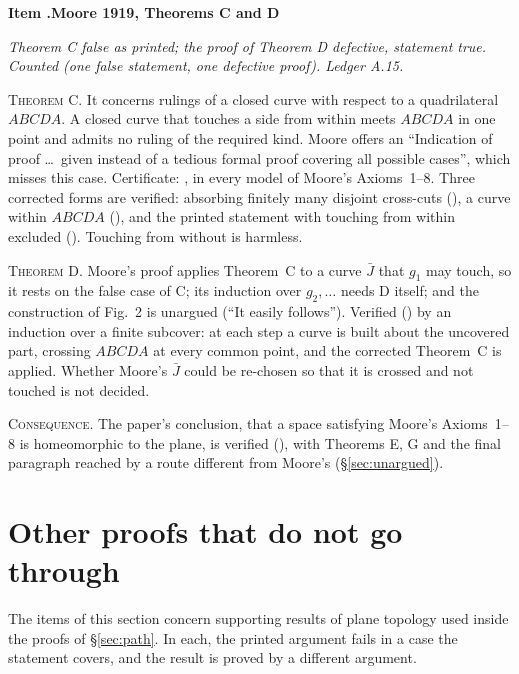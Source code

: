 \documentclass[11pt]{article}
\newcounter{defect}
\newenvironment{defect}[4]{%
  \par\addvspace{10pt}\refstepcounter{defect}%
  \noindent\textbf{Item \thedefect.\enspace #1}\par\nopagebreak
  \noindent\textit{#2}\par\nopagebreak\smallskip}{\par\addvspace{6pt}}
\newcommand{\fld}[1]{\par\noindent\textsc{#1.}\enspace}
\begin{document}
\begin{defect}{Moore 1919, Theorems C and D}{Theorem C false as printed; the proof of Theorem D
defective, statement true. Counted (one false statement, one defective proof). Ledger
A.15.}{1}{1}\label{it:m19}

\fld{Theorem C} It concerns rulings of a closed curve with respect to a quadrilateral $ABCDA$. A
closed curve that touches a side from within meets $ABCDA$ in one point and admits no ruling of the
required kind. Moore offers an ``Indication of proof \ldots\ given instead of a tedious formal proof
covering all possible cases'', which misses this case. Certificate:
, in every model of Moore's Axioms~1--8. Three corrected forms are
verified: absorbing finitely many disjoint cross-cuts (), a curve
within $ABCDA$ (), and the printed statement with touching from within
excluded (). Touching from without is harmless.

\fld{Theorem D} Moore's proof applies Theorem~C to a curve $\bar J$ that $g_1$ may touch, so it
rests on the false case of C; its induction over $g_2,\ldots$ needs D itself; and the construction
of Fig.~2 is unargued (``It easily follows''). Verified () by an induction over a
finite subcover: at each step a curve is built about the uncovered part, crossing $ABCDA$ at every
common point, and the corrected Theorem~C is applied. Whether Moore's $\bar J$ could be re-chosen
so that it is crossed and not touched is not decided.

\fld{Consequence} The paper's conclusion, that a space satisfying Moore's Axioms~1--8 is
homeomorphic to the plane, is verified (), with Theorems E, G and the final
paragraph reached by a route different from Moore's (\S\ref{sec:unargued}).
\end{defect}

\section{Other proofs that do not go through}\label{sec:other}

The items of this section concern supporting results of plane topology used inside the proofs of
\S\ref{sec:path}. In each, the printed argument fails in a case the statement covers, and the
result is proved by a different argument.
\end{document}
